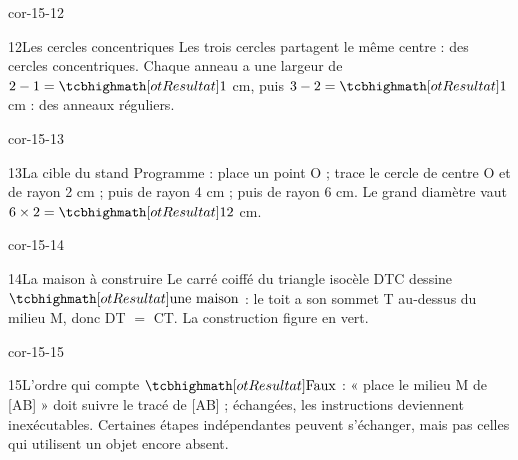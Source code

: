 \begin{blocLivre}{cor-15-12}\begin{corrige}{12}{Les cercles concentriques}
Les trois cercles partagent le même centre : des cercles concentriques. Chaque anneau a une largeur de $2-1=\res1$ cm, puis $3-2=\res1$ cm : des anneaux réguliers.
\label{fig-cor-15-12}
\end{corrige}\end{blocLivre}
\begin{blocLivre}{cor-15-13}\begin{corrige}{13}{La cible du stand}
Programme : place un point O ; trace le cercle de centre O et de rayon 2 cm ; puis de rayon 4 cm ; puis de rayon 6 cm. Le grand diamètre vaut $6\times2=\res{12}$ cm.
\label{fig-cor-15-13}
\end{corrige}\end{blocLivre}
\begin{blocLivre}{cor-15-14}\begin{corrige}{14}{La maison à construire}
Le carré coiffé du triangle isocèle DTC dessine $\res{\text{une maison}}$ : le toit a son sommet T au-dessus du milieu M, donc DT $=$ CT. La construction figure en vert.
\label{fig-cor-15-14}
\end{corrige}\end{blocLivre}
\begin{blocLivre}{cor-15-15}\begin{corrige}{15}{L’ordre qui compte}
$\res{\text{Faux}}$ : « place le milieu M de [AB] » doit suivre le tracé de [AB] ; échangées, les instructions deviennent inexécutables. Certaines étapes indépendantes peuvent s’échanger, mais pas celles qui utilisent un objet encore absent.
\label{fig-cor-15-15}
\end{corrige}\end{blocLivre}

